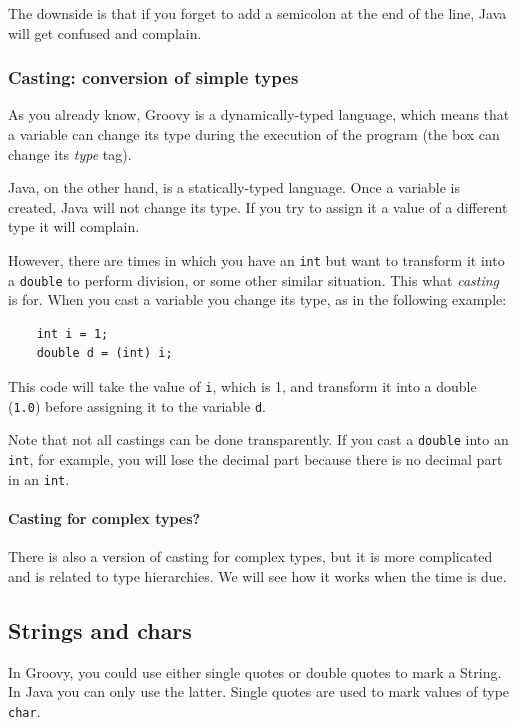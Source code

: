 The downside is that if you forget to add a semicolon at the end of
the line, 
Java will get confused and complain. 


\subsubsection{Casting: conversion of simple types}
\label{sec:cast-conv-simple}

As you already know, Groovy is a dynamically-typed language, which
means that a variable can change its type during the execution of the
program (the box can change its \emph{type} tag). 

Java, on the other hand, is a statically-typed language. Once a
variable is created, Java will not change its type. If you try to
assign it a value of a different type it will complain.

However, there are times in which you have an \verb+int+ but want to
transform it into a \verb+double+ to perform division, or some other
similar situation. This what \emph{casting} is for. When you cast a
variable you change its type, as in the following example: 

\begin{verbatim}
    int i = 1;
    double d = (int) i;
\end{verbatim}

This code will take the value of \verb+i+, which is 1, and transform
it into a double (\verb+1.0+) before assigning it to the
variable \verb+d+. 

Note that not all castings can be done transparently. If you cast a
\verb+double+ into an \verb+int+, for example, you will lose the
decimal part because there is no decimal part in an \verb+int+. 

\paragraph{Casting for complex types?}
\label{sec:cast-compl-types}

There is also a version of casting for complex types, but it is more
complicated and is related to type hierarchies. We will see how it
works when the time is due.

\subsection{Strings and chars}
\label{sec:strings-chars}

In Groovy, you could use either single quotes or double quotes to mark
a String. In Java you can only use the latter. Single quotes are used
to mark values of type \verb+char+. 


